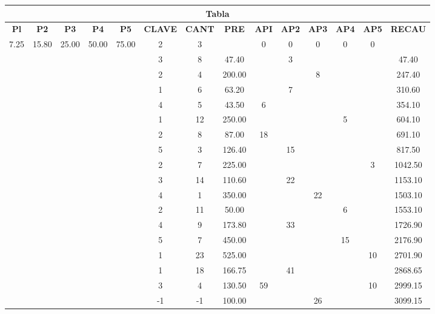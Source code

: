 \documentclass[11pt]{amsart}
\begin{document}
\noindent \begin{tabular}{|c|c|c|c|c|c|c|c|c|c|c|c|c|c|}
    \hline
    \multicolumn{14}{|c|}{\textbf{Tabla}} \\
    \hline
    \textbf{Pl} & \textbf{P2} & \textbf{P3} & \textbf{P4} & \textbf{P5} & \textbf{CLAVE} & \textbf{CANT} & \textbf{PRE} & \textbf{API} & \textbf{AP2} & \textbf{AP3} & \textbf{AP4} & \textbf{AP5} & \textbf{RECAU} \\
    \hline
    7.25 & 15.80 & 25.00 & 50.00 & 75.00 & 2 & 3 &  & 0 & 0 & 0 & 0 & 0 \\
    \hline
     & & & & & 3 & 8 & 47.40 & &3 &  & & &47.40    \\
    \hline
    & & & & &2 & 4 & 200.00 &  & &8 &  & & 247.40 \\
    \hline
    & & & & & 1 & 6 & 63.20 & & 7 & & & & 310.60  \\
    \hline
    & & & & & 4 & 5 & 43.50 & 6 & & & && 354.10  \\
    \hline
   & & & & & 1 & 12 & 250.00 & & && 5 & &604.10    \\
    \hline
    & & & & & 2 & 8 & 87.00 & 18 & & & && 691.10   \\
    \hline
    & & & & & 5 & 3 & 126.40 & &15 & & & & 817.50   \\
    \hline
    & & & & & 2 & 7 & 225.00 & & & & &3 & 1042.50  \\
    \hline
    & & & & & 3 & 14 & 110.60 &  &22 & & & &1153.10   \\
    \hline
    & & & & &  4 & 1 & 350.00 & & &22 & & &1503.10  \\
    \hline
    & & & & &2 & 11 & 50.00 & & & &6 && 1553.10   \\
    \hline
    & & & & &4 & 9 & 173.80 & &33 & & & &1726.90    \\
    \hline
    & & & & &5 & 7 & 450.00 & & & &15 & &  2176.90  \\
    \hline
    & & & & &1 & 23 & 525.00 & & & & &10 & 2701.90   \\
    \hline
   & & & & &  1 & 18 & 166.75 && 41 &  & & & 2868.65 \\
    \hline
    & & & & &3 & 4& 130.50 & 59& & & &10 & 2999.15   \\
    \hline
   & & & & &  -1 & -1 & 100.00 & &  & 26 & & & 3099.15 \\
    \hline

    
    \end{tabular}
\end{document}
